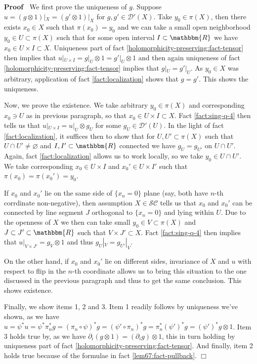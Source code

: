 \documentclass{article}
\newenvironment{proof}{\noindent\textbf{Proof\ }}{\hspace*{\fill}$\Box$\medskip}
\numberwithin{definition}{section}
\numberwithin{lemma}{section}
\numberwithin{proposition}{section}
{\theorembodyfont{\rmfamily}\newtheorem{remark}{Remark}
\numberwithin{remark}{section}
}
\begin{document}
\begin{proof}
  We first prove the uniqueness of $g$. Suppose $u = ( g \otimes 1) |_X = ( g'
  \otimes 1) |_X$ for $g, g' \in \mathcal{D}' ( X)$. Take $y_0 \in \pi ( X)$,
  then there exists $x_0 \in X$ such that $\pi ( x_0) = y_0$ and we can take a
  small open neighborhood $y_0 \in U \subset \pi ( X)$ such that for some open
  interval $I \subset \mathbbm{R}$ we have $x_0 \in U \times I \subset X$.
  Uniqueness part of fact \ref{holomorphicity-preserving:fact-tensor} then
  implies that $u |_{U \times I} = g |_U \otimes 1 = g' |_U \otimes 1$ and
  then again uniqueness of fact \ref{holomorphicity-preserving:fact-tensor}
  implies that $g |_U = g' |_U$. As $y_0 \in X$ was arbitrary, application of
  fact \ref{fact:localization} shows that $g = g'$. This shows the uniqueness.
  
  Now, we prove the existence. We take arbitrary $y_0 \in \pi ( X)$ and
  corresponding $x_0 \ni U$ as in previous paragraph, so that $x_0 \in U
  \times I \subset X$. Fact \ref{fact:sing-q-4} then tells us that $u |_{U
  \times I} = u |_U \otimes g_U$ for some $g_U \in \mathcal{D}' ( U)$. In the
  light of fact \ref{fact:localization}, it suffices then to show that for $U,
  U' \subset \pi ( X)$ such that $U \cap U' \neq \varnothing$ and $I, I'
  \subset \mathbbm{R}$ connected we have $g_U = g_{U'}$ on $U \cap U'$. Again,
  fact \ref{fact:localization} allows us to work locally, so we take $y_0 \in
  U \cap U'$. We take corresponding $x_0 \in U \times I$ and $x_0' \in U
  \times I'$ such that $\pi ( x_0) = \pi ( x_0') = y_0$.
  
  If $x_0$ and $x_0'$ lie on the same side of $\{ x_n = 0 \}$ plane (say, both
  have $n$-th corrdinate non-negative), then assumption $X \in
  \mathcal{S}\mathcal{C}$ tells us that $x_0$ and $x_0'$ can be connected by
  line segment $J$ orthogonal to $\{ x_n = 0 \}$ and lying within $U$. Due to
  the openness of $X$ we then can take small $y_0 \in V \subset \pi ( X)$ and
  $J \subset J' \subset \mathbbm{R}$ such that $V \times J' \subset X$. Fact
  \ref{fact:sing-q-4} then implies that $u |_{V \times J'} = g_V \otimes 1$
  and thus $g_U |_V = g_{U'} |_V$.
  
  On the other hand, if $x_0$ and $x_0'$ lie on different sides, invariance
  of $X$ and $u$ with respect to flip in the $n$-th coordinate allows us to
  bring this situation to the one discussed in the previous paragraph and thus
  to get the same conclusion. This shows existence.
  
  Finally, we show items 1, 2 and 3. Item 1 readily follows by uniqueness
  we've shown, as we have $u = \psi^{\ast} u = \psi^{\ast} \pi_n^{\ast} g = (
  \pi_n \circ \psi)^{\ast} g = ( \psi' \circ \pi_n)^{\ast} g = \pi_n^{\ast} (
  \psi')^{\ast} g = ( \psi')^{\ast} g \otimes 1$. Item 3 holds true by, as we
  have $\partial_i ( g \otimes 1) = ( \partial_i g) \otimes 1$, this in turn
  holding by uniqueness part of fact
  \ref{holomorphicity-preserving:fact-tensor}. And finally, item 2 holds true
  because of the formulae in fact \ref{lem67:fact-pullback}.
\end{proof}
\end{document}
